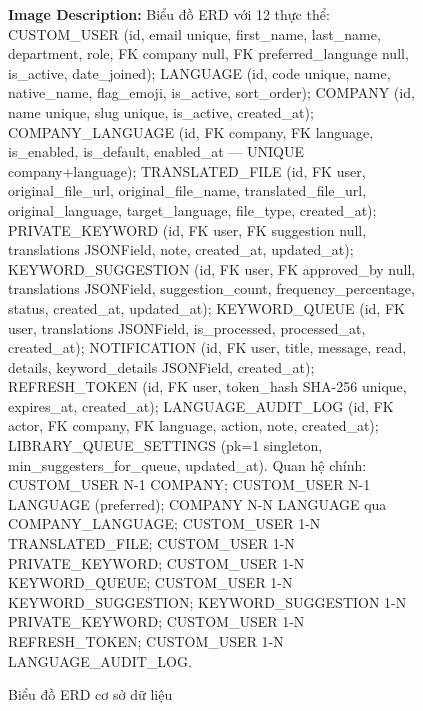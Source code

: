 \begin{figure}[H]
{{%
%
\textbf{Image Description:} Biểu đồ ERD với 12 thực thể:
CUSTOM\_USER (id, email unique, first\_name, last\_name, department, role, FK company null, FK preferred\_language null, is\_active, date\_joined);
LANGUAGE (id, code unique, name, native\_name, flag\_emoji, is\_active, sort\_order);
COMPANY (id, name unique, slug unique, is\_active, created\_at);
COMPANY\_LANGUAGE (id, FK company, FK language, is\_enabled, is\_default, enabled\_at --- UNIQUE company+language);
TRANSLATED\_FILE (id, FK user, original\_file\_url, original\_file\_name, translated\_file\_url, original\_language, target\_language, file\_type, created\_at);
PRIVATE\_KEYWORD (id, FK user, FK suggestion null, translations JSONField, note, created\_at, updated\_at);
KEYWORD\_SUGGESTION (id, FK user, FK approved\_by null, translations JSONField, suggestion\_count, frequency\_percentage, status, created\_at, updated\_at);
KEYWORD\_QUEUE (id, FK user, translations JSONField, is\_processed, processed\_at, created\_at);
NOTIFICATION (id, FK user, title, message, read, details, keyword\_details JSONField, created\_at);
REFRESH\_TOKEN (id, FK user, token\_hash SHA-256 unique, expires\_at, created\_at);
LANGUAGE\_AUDIT\_LOG (id, FK actor, FK company, FK language, action, note, created\_at);
LIBRARY\_QUEUE\_SETTINGS (pk=1 singleton, min\_suggesters\_for\_queue, updated\_at).
Quan hệ chính: CUSTOM\_USER N-1 COMPANY; CUSTOM\_USER N-1 LANGUAGE (preferred);
COMPANY N-N LANGUAGE qua COMPANY\_LANGUAGE; CUSTOM\_USER 1-N TRANSLATED\_FILE;
CUSTOM\_USER 1-N PRIVATE\_KEYWORD; CUSTOM\_USER 1-N KEYWORD\_QUEUE;
CUSTOM\_USER 1-N KEYWORD\_SUGGESTION; KEYWORD\_SUGGESTION 1-N PRIVATE\_KEYWORD;
CUSTOM\_USER 1-N REFRESH\_TOKEN; CUSTOM\_USER 1-N LANGUAGE\_AUDIT\_LOG.
\vspace{0.5cm}}}
\caption{Biểu đồ ERD cơ sở dữ liệu}
\label{fig:erd}
\end{figure}

